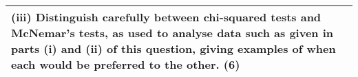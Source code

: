 \documentclass[a4paper,12pt]{article}
\begin{document}
\begin{table}[ht!]
 
\centering
 
\begin{tabular}{|p{15cm}|}
 
\hline  

(iii) Distinguish carefully between chi-squared tests and McNemar's tests, as used to analyse data such as given in parts (i) and (ii) of this question, giving examples of when each would be preferred to the other. (6) 
 
\\ \hline
  
\end{tabular}

\end{table} 

\end{document}

